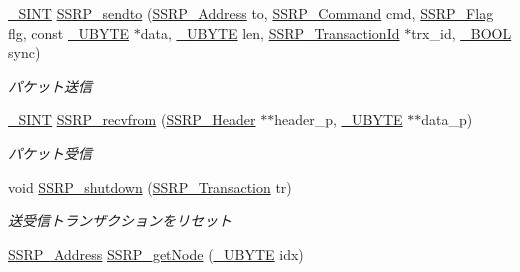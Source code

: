 \begin{DoxyCompactItemize}
\hyperlink{stddef_8h_aefd1068e35d26c0e7d7079ddf2579174_aefd1068e35d26c0e7d7079ddf2579174}{\+\_\+\+S\+I\+N\+T} \hyperlink{ssrp_8h_a04ccac7f6ab40db3f94a87dbdee7c4ba_a04ccac7f6ab40db3f94a87dbdee7c4ba}{S\+S\+R\+P\+\_\+sendto} (\hyperlink{ssrp_8h_af52db94d5ce59044edabda26c25f92f9_af52db94d5ce59044edabda26c25f92f9}{S\+S\+R\+P\+\_\+\+Address} to, \hyperlink{ssrp_8h_a90e773bf16f83fcbc70733b85f7ae614_a90e773bf16f83fcbc70733b85f7ae614}{S\+S\+R\+P\+\_\+\+Command} cmd, \hyperlink{ssrp_8h_a1f7d2b0dad1935ce49334c86a67d202a_a1f7d2b0dad1935ce49334c86a67d202a}{S\+S\+R\+P\+\_\+\+Flag} flg, const \hyperlink{stddef_8h_aac464b47452ce9406f88ef194e2becc1_aac464b47452ce9406f88ef194e2becc1}{\+\_\+\+U\+B\+Y\+T\+E} $\ast$data, \hyperlink{stddef_8h_aac464b47452ce9406f88ef194e2becc1_aac464b47452ce9406f88ef194e2becc1}{\+\_\+\+U\+B\+Y\+T\+E} len, \hyperlink{ssrp_8h_a4ffad5beeb1efa21afe8cd4070a9bdf8_a4ffad5beeb1efa21afe8cd4070a9bdf8}{S\+S\+R\+P\+\_\+\+Transaction\+Id} $\ast$trx\+\_\+id, \hyperlink{stddef_8h_afbf708854fe02af8475a9ba02f3196cb_afbf708854fe02af8475a9ba02f3196cb}{\+\_\+\+B\+O\+O\+L} sync)
\begin{DoxyCompactList}\small\item\em パケット送信 \end{DoxyCompactList}\item 
\hyperlink{stddef_8h_aefd1068e35d26c0e7d7079ddf2579174_aefd1068e35d26c0e7d7079ddf2579174}{\+\_\+\+S\+I\+N\+T} \hyperlink{ssrp_8h_a057ba3555e8181a3e871dd68bac779d6_a057ba3555e8181a3e871dd68bac779d6}{S\+S\+R\+P\+\_\+recvfrom} (\hyperlink{ssrp_8h_d2/df5/structSSRP__Header}{S\+S\+R\+P\+\_\+\+Header} $\ast$$\ast$header\+\_\+p, \hyperlink{stddef_8h_aac464b47452ce9406f88ef194e2becc1_aac464b47452ce9406f88ef194e2becc1}{\+\_\+\+U\+B\+Y\+T\+E} $\ast$$\ast$data\+\_\+p)
\begin{DoxyCompactList}\small\item\em パケット受信 \end{DoxyCompactList}\item 
void \hyperlink{ssrp_8h_afc3503104a5f854cf94ad33924c6a864_afc3503104a5f854cf94ad33924c6a864}{S\+S\+R\+P\+\_\+shutdown} (\hyperlink{ssrp_8h_a97957e4b5b03d11a84ca43c725d2ec75_a97957e4b5b03d11a84ca43c725d2ec75}{S\+S\+R\+P\+\_\+\+Transaction} tr)
\begin{DoxyCompactList}\small\item\em 送受信トランザクションをリセット \end{DoxyCompactList}\item 
\hyperlink{ssrp_8h_af52db94d5ce59044edabda26c25f92f9_af52db94d5ce59044edabda26c25f92f9}{S\+S\+R\+P\+\_\+\+Address} \hyperlink{ssrp_8h_a4d405bb7dc969ef985256e8c8088c7e4_a4d405bb7dc969ef985256e8c8088c7e4}{S\+S\+R\+P\+\_\+get\+Node} (\hyperlink{stddef_8h_aac464b47452ce9406f88ef194e2becc1_aac464b47452ce9406f88ef194e2becc1}{\+\_\+\+U\+B\+Y\+T\+E} idx)

\end{DoxyCompactItemize}
